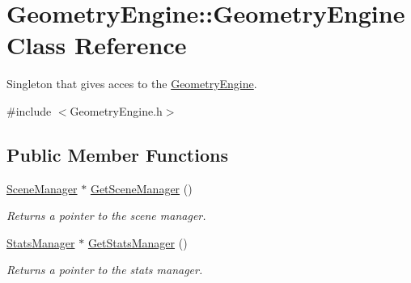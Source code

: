 \hypertarget{class_geometry_engine_1_1_geometry_engine}{}\section{Geometry\+Engine\+::Geometry\+Engine Class Reference}
\label{class_geometry_engine_1_1_geometry_engine}


Singleton that gives acces to the \mbox{\hyperlink{class_geometry_engine_1_1_geometry_engine}{Geometry\+Engine}}.  




{\ttfamily \#include $<$Geometry\+Engine.\+h$>$}

\subsection*{Public Member Functions}
\begin{DoxyCompactItemize}
\item 
\mbox{\label{class_geometry_engine_1_1_geometry_engine_a05ef74c582d54368b8df90b84a889f73}} 
\mbox{\hyperlink{class_geometry_engine_1_1_scene_manager}{Scene\+Manager}} $\ast$ \mbox{\hyperlink{class_geometry_engine_1_1_geometry_engine_a05ef74c582d54368b8df90b84a889f73}{Get\+Scene\+Manager}} ()
\begin{DoxyCompactList}\small\item\em Returns a pointer to the scene manager. \end{DoxyCompactList}\item 
\mbox{\label{class_geometry_engine_1_1_geometry_engine_a37d7561f16de97616b148f83d33adf6e}} 
\mbox{\hyperlink{class_geometry_engine_1_1_stats_manager}{Stats\+Manager}} $\ast$ \mbox{\hyperlink{class_geometry_engine_1_1_geometry_engine_a37d7561f16de97616b148f83d33adf6e}{Get\+Stats\+Manager}} ()
\begin{DoxyCompactList}\small\item\em Returns a pointer to the stats manager. \end{DoxyCompactList}\end{DoxyCompactItemize}
